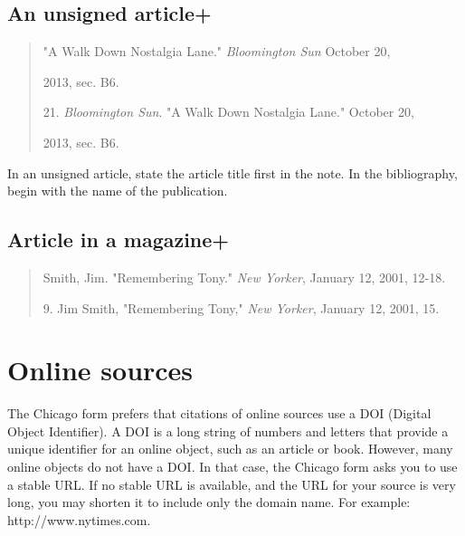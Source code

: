 \subsection{An unsigned article+}

\begin{quote}
"A Walk Down Nostalgia Lane." \emph{Bloomington Sun} October 20, 

\hspace{.4in}2013, sec. B6.

\medskip

\hspace{.4in}21. \emph{Bloomington Sun}. "A Walk Down Nostalgia Lane." October 20,

2013, sec. B6.

\end{quote}

 In an unsigned article, state the article title first in the note. In the bibliography, begin
with the name of the publication.



\subsection{Article in a magazine+}
\begin{quote}
Smith, Jim. "Remembering Tony." \emph{New Yorker}, January 12, 2001, 12-18.

\medskip

\hspace{.4in}9. Jim Smith, "Remembering Tony," \emph{New Yorker}, January 12, 2001, 15.

\end{quote}

\section{Online sources}

The Chicago form prefers that citations of online sources use a DOI (Digital Object Identifier).
A DOI is a long string of numbers and letters that provide a unique identifier for an online object, 
such as an article or book. However, many online objects do not have a DOI. In that case, the Chicago 
form asks you to use a stable URL. If no stable URL is available, and the URL for your source is very long,
you may shorten it to include only the domain name. For example: http://www.nytimes.com.

